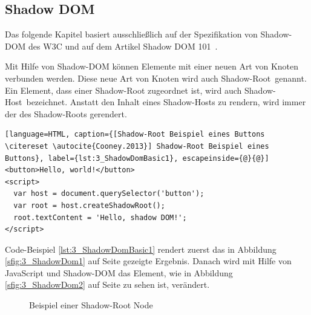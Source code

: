 \subsection{Shadow DOM}
\label{sec:3_WC_Shadow_DOM}

Das folgende Kapitel basiert ausschließlich auf der Spezifikation von Shadow-DOM des W3C \citereset \autocite[siehe][]{GlazkovShadowDOM.2013} und auf dem Artikel \glqq Shadow DOM 101\grqq\ \citereset \autocite[siehe][]{Cooney.2013}.

Mit Hilfe von Shadow-DOM können Elemente mit einer neuen Art von Knoten verbunden werden. Diese neue Art von Knoten wird auch \glqq Shadow-Root\grqq\ genannt. Ein Element, dass einer Shadow-Root zugeordnet ist, wird auch \glqq Shadow-Host\grqq\ bezeichnet. Anstatt den Inhalt eines Shadow-Hosts zu rendern, wird immer der des Shadow-Roots gerendert.

\begin{lstlisting}[language=HTML, caption={[Shadow-Root Beispiel eines Buttons \citereset \autocite{Cooney.2013}] Shadow-Root Beispiel eines Buttons}, label={lst:3_ShadowDomBasic1}, escapeinside={@}{@}]
<button>Hello, world!</button>
<script>
  var host = document.querySelector('button');
  var root = host.createShadowRoot();
  root.textContent = 'Hello, shadow DOM!';
</script>
\end{lstlisting}

Code-Beispiel \ref{lst:3_ShadowDomBasic1} rendert zuerst das in Abbildung \ref{sfig:3_ShadowDom1} auf Seite \pageref{sfig:3_ShadowDom1} gezeigte Ergebnis. Danach wird mit Hilfe von JavaScript und Shadow-DOM das Element, wie in Abbildung \ref{sfig:3_ShadowDom2} auf Seite \pageref{sfig:3_ShadowDom2} zu sehen ist, verändert.

\begin{figure}[h]
  \centering
  \qquad
  \caption[
    Beispiel einer Shadow-Root Node
  ]{
    Beispiel einer Shadow-Root Node
  }
  \label{sfig:3_ShadowDom}
\end{figure}

